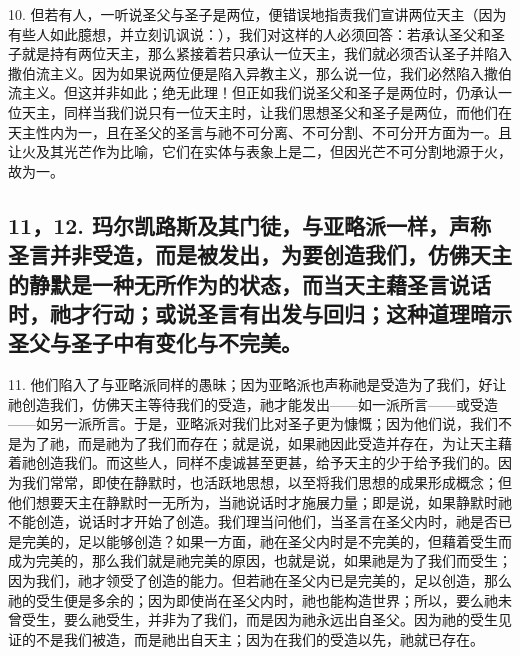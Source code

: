 10. 但若有人，一听说圣父与圣子是两位，便错误地指责我们宣讲两位天主（因为有些人如此臆想，并立刻讥讽说：），我们对这样的人必须回答：若承认圣父和圣子就是持有两位天主，那么紧接着若只承认一位天主，我们就必须否认圣子并陷入撒伯流主义。因为如果说两位便是陷入异教主义，那么说一位，我们必然陷入撒伯流主义。但这并非如此；绝无此理！但正如我们说圣父和圣子是两位时，仍承认一位天主，同样当我们说只有一位天主时，让我们思想圣父和圣子是两位，而他们在天主性内为一，且在圣父的圣言与祂不可分离、不可分割、不可分开方面为一。且让火及其光芒作为比喻，它们在实体与表象上是二，但因光芒不可分割地源于火，故为一。\par


\subsection{11，12. 玛尔凯路斯及其门徒，与亚略派一样，声称圣言并非受造，而是被发出，为要创造我们，仿佛天主的静默是一种无所作为的状态，而当天主藉圣言说话时，祂才行动；或说圣言有出发与回归；这种道理暗示圣父与圣子中有变化与不完美。}

11. 他们陷入了与亚略派同样的愚昧；因为亚略派也声称祂是受造为了我们，好让祂创造我们，仿佛天主等待我们的受造，祂才能发出——如一派所言——或受造——如另一派所言。于是，亚略派对我们比对圣子更为慷慨；因为他们说，我们不是为了祂，而是祂为了我们而存在；就是说，如果祂因此受造并存在，为让天主藉着祂创造我们。而这些人，同样不虔诚甚至更甚，给予天主的少于给予我们的。因为我们常常，即使在静默时，也活跃地思想，以至将我们思想的成果形成概念；但他们想要天主在静默时一无所为，当祂说话时才施展力量；即是说，如果静默时祂不能创造，说话时才开始了创造。我们理当问他们，当圣言在圣父内时，祂是否已是完美的，足以能够创造？如果一方面，祂在圣父内时是不完美的，但藉着受生而成为完美的，那么我们就是祂完美的原因，也就是说，如果祂是为了我们而受生；因为我们，祂才领受了创造的能力。但若祂在圣父内已是完美的，足以创造，那么祂的受生便是多余的；因为即使尚在圣父内时，祂也能构造世界；所以，要么祂未曾受生，要么祂受生，并非为了我们，而是因为祂永远出自圣父。因为祂的受生见证的不是我们被造，而是祂出自天主；因为在我们的受造以先，祂就已存在。\par

